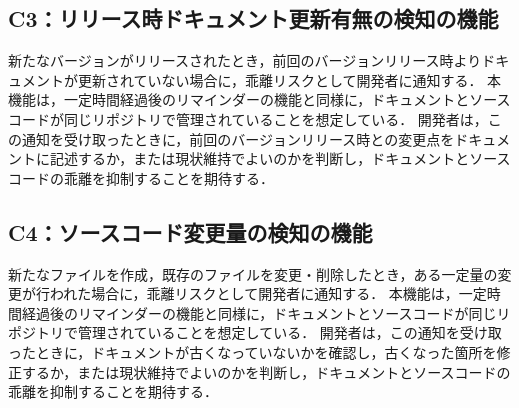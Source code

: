\subsection{C3：リリース時ドキュメント更新有無の検知の機能}
新たなバージョンがリリースされたとき，前回のバージョンリリース時よりドキュメントが更新されていない場合に，乖離リスクとして開発者に通知する．
本機能は，一定時間経過後のリマインダーの機能と同様に，ドキュメントとソースコードが同じリポジトリで管理されていることを想定している．
開発者は，この通知を受け取ったときに，前回のバージョンリリース時との変更点をドキュメントに記述するか，または現状維持でよいのかを判断し，ドキュメントとソースコードの乖離を抑制することを期待する．

\subsection{C4：ソースコード変更量の検知の機能}
新たなファイルを作成，既存のファイルを変更・削除したとき，ある一定量の変更が行われた場合に，乖離リスクとして開発者に通知する．
本機能は，一定時間経過後のリマインダーの機能と同様に，ドキュメントとソースコードが同じリポジトリで管理されていることを想定している．
開発者は，この通知を受け取ったときに，ドキュメントが古くなっていないかを確認し，古くなった箇所を修正するか，または現状維持でよいのかを判断し，ドキュメントとソースコードの乖離を抑制することを期待する．